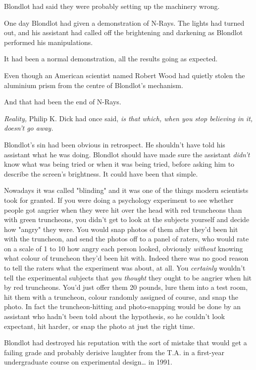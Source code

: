 Blondlot had said they were probably setting up the machinery wrong.

One day Blondlot had given a demonstration of N-Rays. The lights had turned
out, and his assistant had called off the brightening and darkening as Blondlot
performed his manipulations.

It had been a normal demonstration, all the results going as expected.

Even though an American scientist named Robert Wood had quietly stolen the
aluminium prism from the centre of Blondlot's mechanism.

And that had been the end of N-Rays.

\emph{Reality,} Philip K. Dick had once said, \emph{is that which, when you
stop believing in it, doesn't go away.}

Blondlot's sin had been obvious in retrospect. He shouldn't have told his
assistant what he was doing. Blondlot should have made sure the assistant
\emph{didn't} know what was being tried or when it was being tried, before
asking him to describe the screen's brightness. It could have been that simple.

Nowadays it was called "blinding" and it was one of the things modern
scientists took for granted. If you were doing a psychology experiment to see
whether people got angrier when they were hit over the head with red truncheons
than with green truncheons, you didn't get to look at the subjects yourself and
decide how "angry" they were. You would snap photos of them after they'd been
hit with the truncheon, and send the photos off to a panel of raters, who would
rate on a scale of 1 to 10 how angry each person looked, obviously
\emph{without} knowing what colour of truncheon they'd been hit with. Indeed
there was no good reason to tell the raters what the experiment was about, at
all. You \emph{certainly} wouldn't tell the experimental subjects that
\emph{you thought} they ought to be angrier when hit by red truncheons. You'd
just offer them 20 pounds, lure them into a test room, hit them with a
truncheon, colour randomly assigned of course, and snap the photo. In fact the
truncheon-hitting and photo-snapping would be done by an assistant who hadn't
been told about the hypothesis, so he couldn't look expectant, hit harder, or
snap the photo at just the right time.

Blondlot had destroyed his reputation with the sort of mistake that would get a
failing grade and probably derisive laughter from the T.A. in a first-year
undergraduate course on experimental design{\ldots} in 1991.

